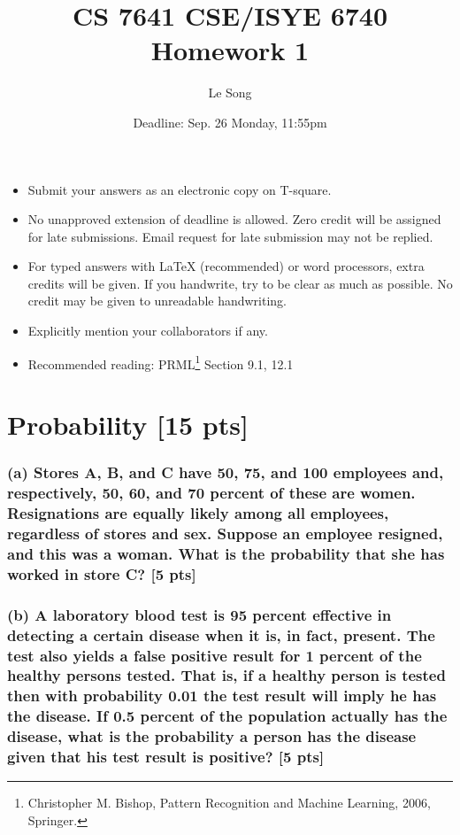 \documentclass[twoside,10pt]{article}
\begin{document}
\title{CS 7641 CSE/ISYE 6740 Homework 1}
\author{Le Song}
\date{Deadline: Sep. 26 Monday, 11:55pm}
\maketitle

\begin{itemize}
  \item Submit your answers as an electronic copy on T-square.
  \item No unapproved extension of deadline is allowed. Zero credit will be assigned for late submissions. Email request for late submission may not be replied.
  \item For typed answers with LaTeX (recommended) or word processors, extra credits will be given. If you handwrite, try to be clear as much as possible. No credit may be given to unreadable handwriting.
  \item Explicitly mention your collaborators if any.
  \item Recommended reading: PRML\footnote{Christopher M. Bishop, Pattern Recognition and Machine
Learning, 2006, Springer.} Section 9.1, 12.1
\end{itemize}

\section{Probability [15 pts]}

\subsubsection*{(a) Stores A, B, and C have 50, 75, and 100 employees and, respectively, 50, 60, and 70 percent of these are women. Resignations are equally likely among all employees, regardless of stores and sex. Suppose an employee resigned, and this was a woman. What is the probability that she has worked in store C? [5 pts]}

\subsubsection*{(b) A laboratory blood test is 95 percent effective in detecting a certain disease when it is, in fact, present. The test also yields a false positive result for 1 percent of the healthy persons tested. That is, if a healthy person is tested then with probability 0.01 the test result will imply he has the disease. If 0.5 percent of the population actually has the disease, what is the probability a person has the disease given that his test result is positive? [5 pts]}
\end{document}

